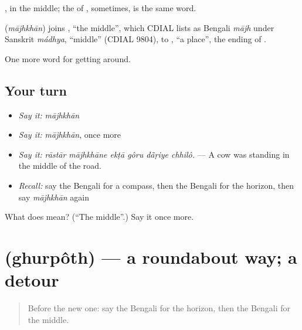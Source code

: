 , in the middle; the  of  , sometimes, is the same word.

\begin{cousinweb}
\textbf{} (\emph{mājhkhān}) joins , \textquotedblleft{}the middle\textquotedblright{}, which CDIAL lists as Bengali \emph{mājh} under Sanskrit \emph{mádhya}, \textquotedblleft{}middle\textquotedblright{} (CDIAL 9804), to , \textquotedblleft{}a place\textquotedblright{}, the ending of .
\end{cousinweb}

\begin{grammarlens}[title={What you've built}]
One more word for getting around.
\end{grammarlens}

\subsection*{Your turn}
\begin{itemize}
\raggedright
  \item \emph{Say it:} \emph{mājhkhān}
  \item \emph{Say it:} \emph{mājhkhān}, once more
  \item \emph{Say it:} \emph{rāstār mājhkhāne ekṭā gôru dā̃ṛiye chhilô.} — A cow was standing in the middle of the road.
  \item \emph{Recall:} say the Bengali for a compass, then the Bengali for the horizon, then say \emph{mājhkhān} again
\end{itemize}

\begin{tcolorbox}[breakable,colback=teal!4,colframe=teal!35!black,title={Before you move on}]
What does  mean? (\textquotedblleft{}The middle\textquotedblright{}.) Say it once more.
\end{tcolorbox}
\section[\texorpdfstring{\bn{ঘুরপথ} (ghurpôth)}{ঘুরপথ (ghurpôth)}]{ (ghurpôth) — a roundabout way; a detour}

\label{lesson:BN-C402-ghurpoth}



\begin{quote}
Before the new one: say the Bengali for the horizon, then the Bengali for the middle.
\end{quote}

